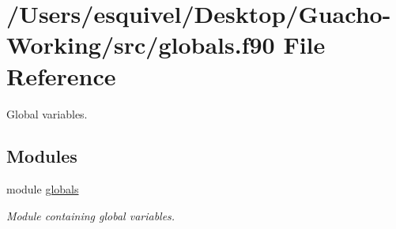 \hypertarget{globals_8f90}{}\section{/\+Users/esquivel/\+Desktop/\+Guacho-\/\+Working/src/globals.f90 File Reference}
\label{globals_8f90}


Global variables.  


\subsection*{Modules}
\begin{DoxyCompactItemize}
\item 
module \hyperlink{namespaceglobals}{globals}
\begin{DoxyCompactList}\small\item\em Module containing global variables. \end{DoxyCompactList}\end{DoxyCompactItemize}
